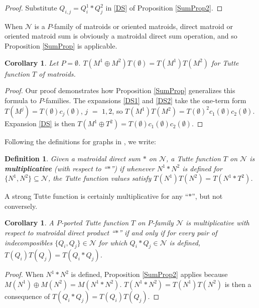 \documentclass[12pt,leqno]{amsart}
\newtheorem{cor}[lem]{Corollary}
\newtheorem{definition}[lem]{Definition}
\theoremstyle{remark}
\begin{document}
\begin{proof}
Substitute $Q_{i,j}=Q^1_i*Q^2_j$ in \eqref{DS} of Proposition \ref{SumProp2}.
\end{proof}


When $\mathcal{N}$ is a $P$-family of matroids or oriented matroids,
direct matroid or oriented matroid sum is obviously a matroidal direct
sum operation, and so Proposition \ref{SumProp} is applicable.

\begin{cor}\cite{Ellis-Monaghan-Traldi}
Let $P=\emptyset$.
$T(M^1\oplus M^2)T(\emptyset) = T(M^1)T(M^2)$ for Tutte
function $T$ of matroids.
\end{cor}

\begin{proof}
Our proof demonstrates how Proposition \ref{SumProp}
generalizes this formula to $P$-families.
The expansions \ref{DS1} and \ref{DS2} take the one-term form
$T(M^j) = T(\emptyset) c_j(\emptyset)$, $j$ $=$ $1,2$,
so $T(M^1)T(M^2)=T(\emptyset)^2 c_1(\emptyset) c_2(\emptyset)$.
Expansion \ref{DS} is then
$T(M^1\oplus T^2)=T(\emptyset) c_1(\emptyset) c_2(\emptyset)$.
\end{proof}

Following the definitions for graphs in \cite{Ellis-Monaghan-Traldi}, we write:

\begin{definition}
Given a matroidal direct sum $*$ on $\mathcal{N}$, 
a Tutte function $T$ on $\mathcal{N}$ is
\textbf{multiplicative} (with respect to ``$*$'')
if whenever $N^1*N^2$ is defined
for $\{N^1,N^2\}\subseteq \mathcal{N}$, the Tutte
function values satisfy 
$T(N^1)T(N^2)=T(N^1*T^2)$.
\end{definition}

A strong Tutte function is certainly multiplicative
for any ``$*$'', but not conversely.

\begin{cor}
A $P$-ported Tutte function $T$ on $P$-family $\mathcal{N}$ 
is multiplicative with respect to matroidal direct product
``$*$'' if and only if 
for every pair of indecomposibles $\{Q_i, Q_j\}\in\mathcal{N}$ for which 
$Q_i*Q_j\in\mathcal{N}$ is defined, $T(Q_i)T(Q_j)=T(Q_i*Q_j)$.
\end{cor}

\begin{proof} 
When $N^1*N^2$ is defined, Proposition \ref{SumProp2}
applies because $M(N^1)\oplus  M(N^2)=M(N^1*N^2)$.
$T(N^1*N^2)=T(N^1)T(N^2)$ is then a consequence
of $T(Q_i*Q_j)=T(Q_i)T(Q_j)$.
\end{proof}
\end{document}
